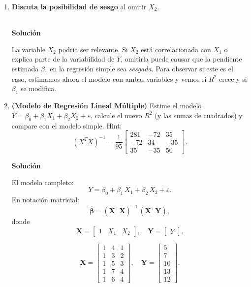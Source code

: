 \documentclass[10pt,a4paper]{article}
\begin{document}
\begin{enumerate}
\begin{enumerate}
\paragraph{1.3.1 $R^2$ ajustado (modelo simple).}

Con $n=5$, $k=1$:
\[
R_{\text{ajustado}}^2
= 1 - \frac{\text{SSR}/(n - k -1)}{\text{SST}/(n-1)}
= 1 - \frac{9.10/3}{45.20/4}
= 1 - \frac{3.0333}{11.30}
\approx 1 -0.2684
= 0.7316.
\]


\[
Y \approx -0.10 +1.90\,X_1,
\quad
R^2 \approx 0.799,
\quad
R_{\text{ajustado}}^2 \approx 0.732.
\]

  \item \textbf{Discuta la posibilidad de sesgo} al omitir $X_2$.

\\

\textbf{Solución}

La variable $X_2$ podr\'ia ser relevante. Si $X_2$ est\'a correlacionada con $X_1$ o explica parte de la variabilidad de $Y$, omitirla puede causar que la pendiente estimada $\beta_1$ en la regresión simple sea \emph{sesgada}. Para observar si este es el caso, estimamos ahora el modelo con ambas variables y vemos si $R^2$ crece y si $\beta_1$ se modifica.

  \item \textbf{(Modelo de Regresión Lineal Múltiple)} Estime el modelo $Y = \beta_0 + \beta_1 X_1 + \beta_2 X_2 + \varepsilon$, calcule el nuevo $R^2$ (y las sumas de cuadrados) y compare con el modelo simple. Hint: 
  \[
(X^TX)^{-1}
= \frac{1}{95}
\begin{bmatrix}
281 & -72 & 35\\
-72 & 34 & -35\\
35 & -35 & 50
\end{bmatrix}.
\]


\textbf{Solución}

El modelo completo:
\[
Y = \beta_0 + \beta_1\,X_1 + \beta_2\,X_2 + \varepsilon.
\]
En notaci\'on matricial:
\[
\hat{\boldsymbol{\beta}}
= (\mathbf{X}^\top \mathbf{X})^{-1} \, (\mathbf{X}^\top \mathbf{Y}),
\]
donde
\[
\mathbf{X}
=
\begin{bmatrix}
1 & X_1 & X_2
\end{bmatrix},
\quad
\mathbf{Y}
=
\begin{bmatrix}
Y
\end{bmatrix}.
\]


\[
\mathbf{X}
=
\begin{bmatrix}
1 & 4 & 1\\
1 & 3 & 2\\
1 & 5 & 3\\
1 & 7 & 4\\
1 & 6 & 4
\end{bmatrix},
\quad
\mathbf{Y}
=
\begin{bmatrix}
5\\
7\\
10\\
13\\
12
\end{bmatrix}.
\]




\end{enumerate}
\end{enumerate}
\end{document}
